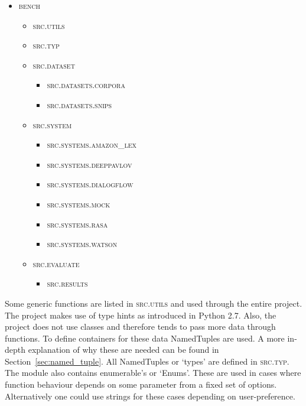 \begin{itemize}
    \item \textsc{bench}
    \begin{itemize}
        \item \textsc{src.utils}
        \item \textsc{src.typ}
        \item \textsc{src.dataset}
        \begin{itemize}
            \item \textsc{src.datasets.corpora}
            \item \textsc{src.datasets.snips}
        \end{itemize}
        \item \textsc{src.system}
        \begin{itemize}
            \item \textsc{src.systems.amazon\_lex}
            \item \textsc{src.systems.deeppavlov}
            \item \textsc{src.systems.dialogflow}
            \item \textsc{src.systems.mock}
            \item \textsc{src.systems.rasa}
            \item \textsc{src.systems.watson}
        \end{itemize}
        \item \textsc{src.evaluate}
        \begin{itemize}
            \item \textsc{src.results}
        \end{itemize}
    \end{itemize}
\end{itemize}

Some generic functions are listed in \textsc{src.utils} and used through the entire project.
The project makes use of type hints as introduced in Python 2.7.
Also, the project does not use classes and therefore tends to pass more data through functions.
To define containers for these data NamedTuples are used.
A more in-depth explanation of why these are needed can be found in Section~\ref{sec:named_tuple}.
All NamedTuples or `types' are defined in \textsc{src.typ}.
The module also contains enumerable's or `Enums'.
These are used in cases where function behaviour depends on some parameter from a fixed set of options.
Alternatively one could use strings for these cases depending on user-preference.

